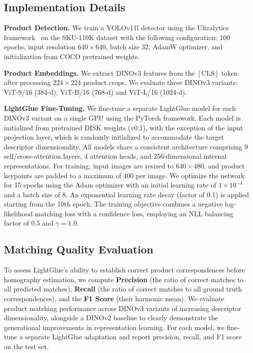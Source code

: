 \documentclass[10pt,twocolumn,letterpaper]{article}
\begin{document}
\subsection{Implementation Details}
\label{subsec:implementation}

\noindent\textbf{Product Detection.}
We train a YOLOv11l detector using the Ultralytics framework~\cite{jocher_ultralytics_yolo_2023} on the SKU-110K dataset with the following configuration: 100 epochs, input resolution $640 \times 640$, batch size 32, AdamW optimizer, and initialization from COCO pretrained weights.

\noindent\textbf{Product Embeddings.}
We extract DINOv3 features from the $[\mathrm{CLS}]$ token after processing $224 \times 224$ product crops.
We evaluate three DINOv3 variants: ViT-S/16 (384-d), ViT-B/16 (768-d) and ViT-L/16 (1024-d).

\noindent\textbf{LightGlue Fine-Tuning.}
We fine-tune a separate LightGlue model for each DINOv3 variant on a single GPU using the PyTorch framework. Each model is initialized from pretrained DISK weights (v0.1), with the exception of the input projection layer, which is randomly initialized to accommodate the target descriptor dimensionality. All models share a consistent architecture comprising 9 self/cross-attention layers, 4 attention heads, and 256-dimensional internal representations. For training, input images are resized to $640 \times 480$, and product keypoints are padded to a maximum of 400 per image. We optimize the network for 15 epochs using the Adam optimizer with an initial learning rate of $1 \times 10^{-4}$ and a batch size of 8. An exponential learning rate decay (factor of 0.1) is applied starting from the 10th epoch. The training objective combines a negative log-likelihood matching loss with a confidence loss, employing an NLL balancing factor of 0.5 and $\gamma = 1.0$.

\subsection{Matching Quality Evaluation}
\label{subsec:matching_quality}

To assess LightGlue's ability to establish correct product correspondences before homography estimation, we compute \textbf{Precision} (the ratio of correct matches to all predicted matches), \textbf{Recall} (the ratio of correct matches to all ground truth correspondences), and the \textbf{F1 Score} (their harmonic mean). We evaluate product matching performance across DINOv3 variants of increasing descriptor dimensionality, alongside a DINOv2 baseline to clearly demonstrate the generational improvements in representation learning. For each model, we fine-tune a separate LightGlue adaptation and report precision, recall, and F1 score on the test set.
\end{document}
